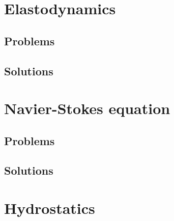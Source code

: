    \chapter{Elastodynamics}
      
      
      
      
      \section{Problems}
         
      \section{Solutions}
         \shipoutAnswer

   \chapter{Navier-Stokes equation}
      
      
      
      
      
      

      \section{Problems}
         
         
         
         
         
         
         
         
      \section{Solutions}
         \shipoutAnswer

   \chapter{Hydrostatics}
      

